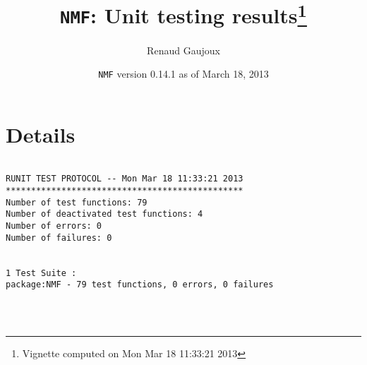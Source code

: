 \documentclass[10pt]{article}
\author{Renaud Gaujoux}
\title{\texttt{NMF}: Unit testing results\footnote{Vignette computed  on Mon Mar 18 11:33:21 2013}}
\date{\texttt{NMF} version 0.14.1 as of March 18, 2013}
\begin{document}
\maketitle

\section{Details}
\begin{verbatim}

RUNIT TEST PROTOCOL -- Mon Mar 18 11:33:21 2013 
*********************************************** 
Number of test functions: 79 
Number of deactivated test functions: 4 
Number of errors: 0 
Number of failures: 0 

 
1 Test Suite : 
package:NMF - 79 test functions, 0 errors, 0 failures




\end{verbatim}
\end{document}
